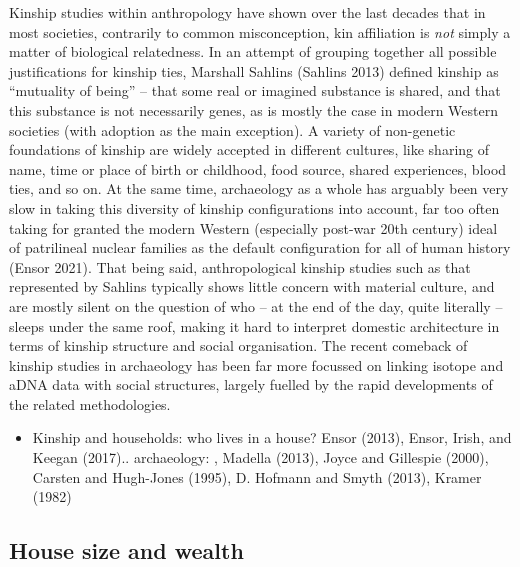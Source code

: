 \documentclass[
  12pt,
  a4paper, twoside]{book}
\providecommand{\tightlist}{%
  \setlength{\itemsep}{0pt}\setlength{\parskip}{0pt}}
\begin{document}
Kinship studies within anthropology have shown over the last decades that in most societies, contrarily to common misconception, kin affiliation is \emph{not} simply a matter of biological relatedness. In an attempt of grouping together all possible justifications for kinship ties, Marshall Sahlins (Sahlins 2013) defined kinship as ``mutuality of being'' -- that some real or imagined substance is shared, and that this substance is not necessarily genes, as is mostly the case in modern Western societies (with adoption as the main exception). A variety of non-genetic foundations of kinship are widely accepted in different cultures, like sharing of name, time or place of birth or childhood, food source, shared experiences, blood ties, and so on. At the same time, archaeology as a whole has arguably been very slow in taking this diversity of kinship configurations into account, far too often taking for granted the modern Western (especially post-war 20th century) ideal of patrilineal nuclear families as the default configuration for all of human history (Ensor 2021). That being said, anthropological kinship studies such as that represented by Sahlins typically shows little concern with material culture, and are mostly silent on the question of who -- at the end of the day, quite literally -- sleeps under the same roof, making it hard to interpret domestic architecture in terms of kinship structure and social organisation. The recent comeback of kinship studies in archaeology has been far more focussed on linking isotope and aDNA data with social structures, largely fuelled by the rapid developments of the related methodologies.

\begin{itemize}
\tightlist
\item
  Kinship and households: who lives in a house? Ensor (2013), Ensor, Irish, and Keegan (2017).. archaeology: , Madella (2013), Joyce and Gillespie (2000), Carsten and Hugh-Jones (1995), D. Hofmann and Smyth (2013), Kramer (1982)
\end{itemize}

\hypertarget{house-size-and-wealth}{%
\subsection{House size and wealth}\label{house-size-and-wealth}}
\end{document}
